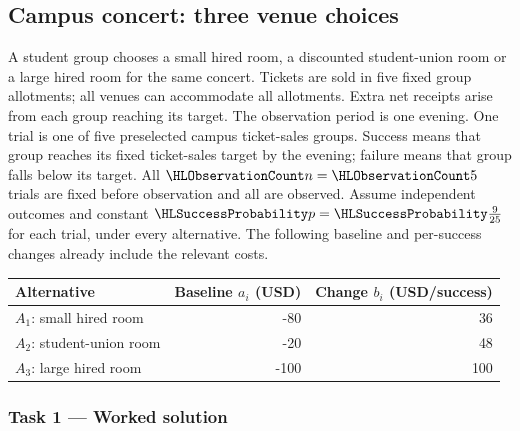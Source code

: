 \subsection{Campus concert: three venue choices}\label{prob:fees}
\label{prob:c4-restaurant}
A student group chooses a small hired room, a discounted student-union room or a large hired room for the same concert. Tickets are sold in five fixed group allotments; all venues can accommodate all allotments. Extra net receipts arise from each group reaching its target.
The observation period is one evening. One trial is one of five preselected campus ticket-sales groups.
Success means that group reaches its fixed ticket-sales target by the evening; failure means that group falls below its target.
All $\TrialCount{n}=\TrialCount{5}$ trials are fixed before observation and all are observed. 
Assume independent outcomes and constant $\SuccessProb{p}=\SuccessProb{\frac{9}{25}}$ for each trial, under every alternative. 
The following baseline and per-success changes already include the relevant costs.
\begin{center}\begin{tabular}{lrr}\toprule Alternative & Baseline $a_i$ (USD) & Change $b_i$ (USD/success)\\\midrule
$A_1$: small hired room & -80 & 36\\
$A_2$: student-union room & -20 & 48\\
$A_3$: large hired room & -100 & 100\\
\bottomrule\end{tabular}\end{center}
\clearpage\subsubsection*{Task 1 --- Worked solution}\label{sol:c4-restaurant-model}

